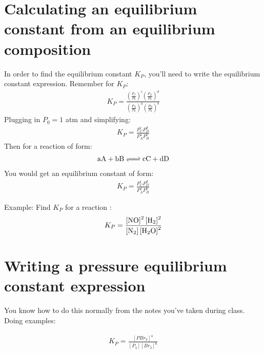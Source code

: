 \documentclass{article}  %
\begin{document}
\section*{Calculating an equilibrium constant from an equilibrium composition}
In order to find the equilibrium constant $K_P$, you'll need to write the equilibrium constant expression. Remember for $K_P$:
\begin{equation*}
    \begin{aligned}
        K_P = \frac{\left(\frac{P_C}{P_0}\right)^c \left(\frac{P_D}{P_0}\right) ^d}{\left(\frac{P_A}{P_0}\right) ^a \left(\frac{P_B}{P_0}\right) ^b}
    \end{aligned}
\end{equation*}
Plugging in $P_0 = 1$ atm and simplifying: 
\begin{equation*}
    \begin{aligned}
        K_P = \frac{P_C^c P_D^d}{P_A^a P_B^b}
    \end{aligned}
\end{equation*}
Then for a reaction of form:
\begin{equation*}
    \begin{aligned}
        \ce{aA + bB <=> cC + dD}
    \end{aligned}
\end{equation*}
You would get an equilibrium constant of form:
\begin{equation*}
    \begin{aligned}
        K_P = \frac{P_C^c P_D^d}{P_A^a P_B^b}
    \end{aligned}
\end{equation*}

Example: Find $K_P$ for a reaction :
\begin{equation*}
    \begin{aligned}
        K_P = \ce{\frac{[NO]^2 [H2]^2}{[N2] [H2O]^2}}
    \end{aligned}
\end{equation*}

\section*{Writing a pressure equilibrium constant expression}
You know how to do this normally from the notes you've taken during class. Doing examples:

\begin{equation*}
    \begin{aligned}
        K_P = \frac{[PBr_3]^4}{[P_4] [Br_2]^6}
    \end{aligned}
\end{equation*}
\end{document}
